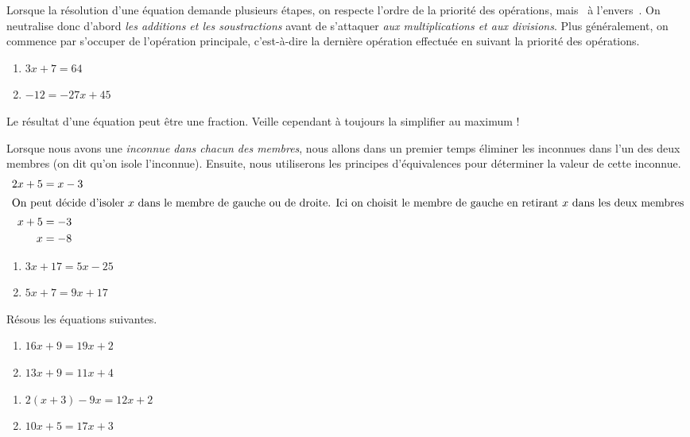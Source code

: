 \documentclass[../../syllabus_2.tex]{subfiles}
\begin{document}
Lorsque la résolution d'une équation demande plusieurs étapes, on
respecte l'ordre de la priorité des opérations, mais \og~à l'envers~\fg{}. On
neutralise donc d'abord \emph{les additions et les soustractions}
avant de s'attaquer \emph{aux multiplications et aux divisions}. Plus généralement, on commence par s'occuper de l'opération principale, c'est-à-dire la dernière opération effectuée en suivant la priorité des opérations.

\exemples
\begin{enumerate}[cols=2]
  \item $3x+7=64$
  \item $-12 = -27x+45$
\end{enumerate}
\vspace*{5cm}

 Le résultat d'une équation peut être une fraction. Veille
  cependant à toujours la simplifier au maximum !


Lorsque nous avons une \emph{inconnue dans chacun des membres}, nous
allons dans un premier temps éliminer les inconnues dans l'un des deux
membres (on dit qu'on isole l'inconnue). Ensuite, nous utiliserons les principes d'équivalences pour déterminer la valeur de cette inconnue.
\begin{align*}
  2x + 5 &= x - 3\\
  \intertext{On peut décide d'isoler $x$ dans le membre de gauche ou de droite. Ici on choisit le membre de gauche en retirant $x$ dans les deux membres}
  x + 5 &= -3\\
  x &= -8
\end{align*}

\exemples
\begin{enumerate}[cols=2]
  \item $3x + 17 = 5x - 25$
  \item $5x+7=9x+17$
\end{enumerate}
\vspace*{5cm}

\begin{exercise}
  Résous les équations suivantes.
  \begin{enumerate}[cols=2]
    \item $16x+9=19x+2$
    \item $13x+9=11x+4$
  \end{enumerate}
  \newpage
  \begin{enumerate}[cols=2, resume]
    \item $2(x + 3) - 9x = 12x + 2$
    \item $10x+5=17x+3$
  \end{enumerate}
  \vspace*{5cm}
\end{exercise}
\end{document}
